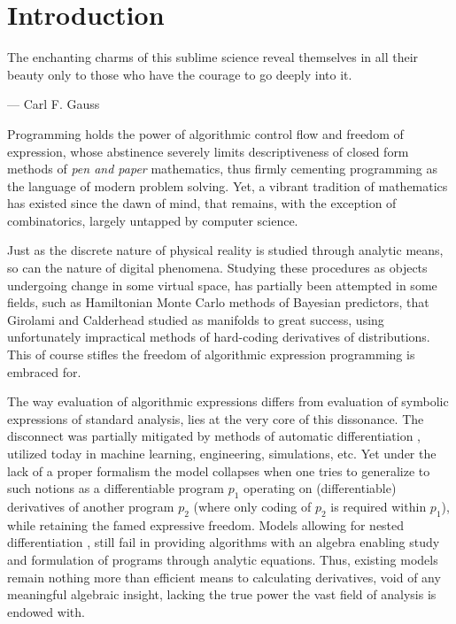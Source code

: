 \documentclass[smallcondensed]{svjour3}
\begin{document}
\section{Introduction}

\epigraph{The enchanting charms of this sublime science reveal themselves in all their beauty only to those who have the courage to go deeply into it.}{--- \textup{Carl F. Gauss}}

Programming holds the power of algorithmic control flow and freedom of expression, whose abstinence severely limits descriptiveness of closed form methods of \textit{pen and paper} mathematics, thus firmly cementing programming as the language of modern problem solving. Yet, a vibrant tradition of mathematics has existed since the dawn of mind, that remains, with the exception of combinatorics, largely untapped by computer science. 

Just as the discrete nature of physical reality is studied through analytic means, so can the nature of digital phenomena. Studying these procedures as objects undergoing change in some virtual space, has partially been attempted in some fields, such as Hamiltonian Monte Carlo methods of Bayesian predictors, that Girolami and Calderhead \cite{StatMC} studied as manifolds to great success, using unfortunately impractical methods of hard-coding derivatives of distributions. This of course stifles the freedom of algorithmic expression programming is embraced for.

The way evaluation of algorithmic expressions differs from evaluation of symbolic expressions of standard analysis, lies at the very core of this dissonance. The disconnect was partially mitigated by methods of automatic differentiation \cite{AdSurvey}, utilized today in machine learning, engineering, simulations, etc. Yet under the lack of a proper formalism the model collapses \cite{AD2} when one tries to generalize to such notions as a differentiable program $p_1$ operating on (differentiable) derivatives of another program $p_2$ (where only coding of $p_2$ is required within $p_1$), while retaining the famed expressive freedom. 
Models allowing for nested differentiation \cite{AD1}, still fail in providing algorithms with an algebra enabling study and formulation of programs through analytic equations. Thus, existing models \cite{PcAD} \cite{ReverseAD} remain nothing more than efficient means to calculating derivatives, void of any meaningful algebraic insight, lacking the true power the vast field of analysis is endowed with.
\end{document}
